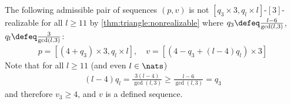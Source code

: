\begin{example}
  The following admissible pair of sequences $(p, v)$ is not $[q_3 \times 3, q_l \times l]$-$[3]$-realizable for all $l \geq 11$ by \autoref{thm:triangle:nonrealizable} where $q_3 \defeq \tfrac{l - 6}{\gcd(l, 3)}$, $q_l \defeq \tfrac{3}{\gcd(l, 3)}$:
  \begin{align*}
    p = [(4 + q_3) \times 3, q_l \times l],\quad v = [(4 - q_3 + (l - 4)q_l) \times 3]
  \end{align*}
  Note that for all $l \geq 11$ (and even $l \in \nats$) 
  \begin{align*}
    (l - 4)q_l = \tfrac{3(l - 4)}{\gcd(l, 3)} \geq \tfrac{l - 6}{\gcd(l, 3)} = q_3
  \end{align*}
  and therefore $v_3 \geq 4$, and $v$ is a defined sequence.
\end{example}
